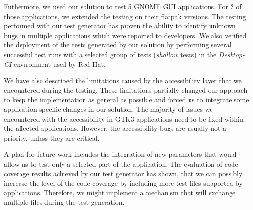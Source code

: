 Futhermore, we used our solution to test 5 GNOME GUI applications. For 2 of those applications, we extended the testing on their flatpak versions. The testing performed with our test generator has proven the ability to identify unknown bugs in multiple applications which were reported to developers. We also verified the deployment of the tests generated by our solution by performing several successful test runs with a selected group of tests (\textit{shallow} tests) in the \textit{Desktop-CI} environment used by Red Hat.

We have also described the limitations caused by the accessibility layer that we encountered during the testing. These limitations partially changed our approach to keep the implementation as general as possible and forced us to integrate some application-specific changes in our solution. The majority of issues we encountered with the accessibility in GTK3 applications need to be fixed within the affected applications. However, the accessibility bugs are usually not a priority, unless they are critical.

A plan for future work includes the integration of new parameters that would allow us to test only a selected part of the application. The evaluation of code coverage results achieved by our test generator has shown, that we can possibly increase the level of the code coverage by including more test files supported by applications. Therefore, we might implement a mechanism that will exchange multiple files during the test generation.  